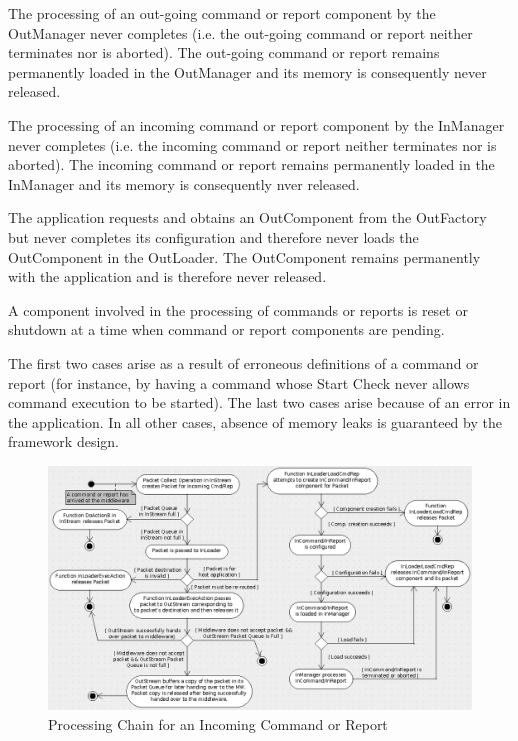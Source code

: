 \documentclass[a4paper,10pt]{article}
\newenvironment{fw_itemize}						%
{\begin{itemize}
  \setlength{\itemsep}{1mm}
  \setlength{\parskip}{0pt}
  \setlength{\parsep}{0pt}}
{\end{itemize}}
\begin{document}
\begin{fw_itemize}
\item The processing of an out-going command or report component by the OutManager never completes (i.e. the out-going command or report neither terminates nor is aborted). The out-going command or report remains permanently loaded in the OutManager and its memory is consequently never released. 
\item The processing of an incoming command or report component by the InManager never completes (i.e. the incoming command or report neither terminates nor is aborted). The incoming command or report remains permanently loaded in the InManager and its memory is consequently nver released. 
\item The application requests and obtains an OutComponent from the OutFactory but never completes its configuration and therefore never loads the OutComponent in the OutLoader. The OutComponent remains permanently with the application and is therefore never released.
\item A component involved in the processing of commands or reports is reset or shutdown at a time when command or report components are pending.
\end{fw_itemize}

The first two cases arise as a result of erroneous definitions of a command or report (for instance, by having a command whose Start Check never allows command execution to be started). The last two cases arise because of an error in the application. In all other cases, absence of memory leaks is guaranteed by the framework design.

\begin{figure}[h]
 \centering
 \includegraphics[scale=0.32,keepaspectratio=true]{InCmpMakeRelChain.png}
 \caption{Processing Chain for an Incoming Command or Report}
 \label{fig:InCmpMakeRelChain}
\end{figure}
\end{document}
